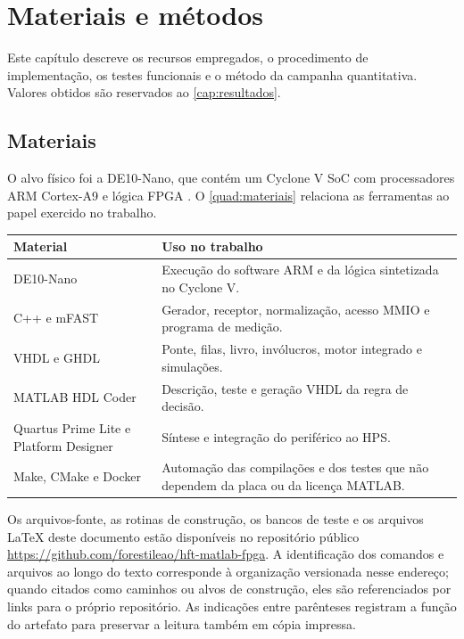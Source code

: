 
\chapter{Materiais e métodos}\label{cap:materialemetodos}

Este capítulo descreve os recursos empregados, o procedimento de implementação, os testes funcionais e o método da campanha quantitativa. Valores obtidos são reservados ao \autoref{cap:resultados}.

\section{Materiais}\label{sec:materiais}

O alvo físico foi a DE10-Nano, que contém um Cyclone V SoC com processadores ARM Cortex-A9 e lógica FPGA \cite{TerasicDE10Nano,IntelCycloneV}. O \autoref{quad:materiais} relaciona as ferramentas ao papel exercido no trabalho.

\begin{tabframed}[htb]
\caption{Materiais empregados no desenvolvimento}
\label{quad:materiais}
\begin{tabularx}{\textwidth}{lX}
\toprule
\textbf{Material} & \textbf{Uso no trabalho} \\ \midrule
DE10-Nano & Execução do software ARM e da lógica sintetizada no Cyclone V. \\
C++ e mFAST & Gerador, receptor, normalização, acesso MMIO e programa de medição. \\
VHDL e GHDL & Ponte, filas, livro, invólucros, motor integrado e simulações. \\
MATLAB HDL Coder & Descrição, teste e geração VHDL da regra de decisão. \\
Quartus Prime Lite e Platform Designer & Síntese e integração do periférico ao HPS. \\
Make, CMake e Docker & Automação das compilações e dos testes que não dependem da placa ou da licença MATLAB. \\ \bottomrule
\end{tabularx}
\end{tabframed}

Os arquivos-fonte, as rotinas de construção, os bancos de teste e os arquivos LaTeX deste documento estão disponíveis no repositório público \url{https://github.com/forestileao/hft-matlab-fpga}. A identificação dos comandos e arquivos ao longo do texto corresponde à organização versionada nesse endereço; quando citados como caminhos ou alvos de construção, eles são referenciados por links para o próprio repositório. As indicações entre parênteses registram a função do artefato para preservar a leitura também em cópia impressa.

